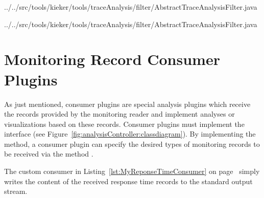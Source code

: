 \setJavaCodeListing
%
{../../src/tools/kieker/tools/traceAnalysis/filter/AbstractTraceAnalysisFilter.java}

\setJavaCodeListing
%
{../../src/tools/kieker/tools/traceAnalysis/filter/AbstractTraceAnalysisFilter.java}

\section{Monitoring Record Consumer Plugins}\label{sec:analysis:consumer}

As just mentioned, consumer plugins are special analysis plugins which receive %
the records provided by the monitoring reader and implement analyses or %
visualizations based on these records. %
Consumer plugins must implement the interface  %
(see Figure~\ref{fig:analysisController:classdiagram}). %
By implementing the  method, a consumer plugin %
can specify the desired types of monitoring records to be received via the %
method .

The custom consumer in Listing~\ref{lst:MyReponseTimeConsumer} on %
page~\pageref{lst:MyReponseTimeConsumer} simply writes %
the content of the received response time records to the standard output stream.

%

